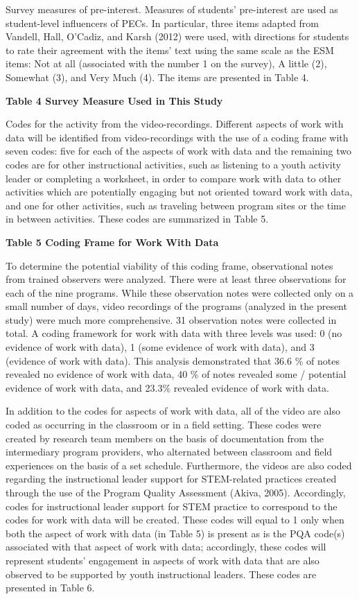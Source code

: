 \documentclass[]{msu-thesis}
\theoremstyle{definition}
\theoremstyle{definition}
\theoremstyle{definition}
\theoremstyle{remark}
\begin{document}
Survey measures of pre-interest. Measures of students' pre-interest are
used as student-level influencers of PECs. In particular, three items
adapted from Vandell, Hall, O'Cadiz, and Karsh (2012) were used, with
directions for students to rate their agreement with the items' text
using the same scale as the ESM items: Not at all (associated with the
number 1 on the survey), A little (2), Somewhat (3), and Very Much (4).
The items are presented in Table 4.

\textbf{Table 4 Survey Measure Used in This Study}

Codes for the activity from the video-recordings. Different aspects of
work with data will be identified from video-recordings with the use of
a coding frame with seven codes: five for each of the aspects of work
with data and the remaining two codes are for other instructional
activities, such as listening to a youth activity leader or completing a
worksheet, in order to compare work with data to other activities which
are potentially engaging but not oriented toward work with data, and one
for other activities, such as traveling between program sites or the
time in between activities. These codes are summarized in Table 5.

\textbf{Table 5 Coding Frame for Work With Data}

To determine the potential viability of this coding frame, observational
notes from trained observers were analyzed. There were at least three
observations for each of the nine programs. While these observation
notes were collected only on a small number of days, video recordings of
the programs (analyzed in the present study) were much more
comprehensive. 31 observation notes were collected in total. A coding
framework for work with data with three levels was used: 0 (no evidence
of work with data), 1 (some evidence of work with data), and 3 (evidence
of work with data). This analysis demonstrated that 36.6 \% of notes
revealed no evidence of work with data, 40 \% of notes revealed some /
potential evidence of work with data, and 23.3\% revealed evidence of
work with data.

In addition to the codes for aspects of work with data, all of the video
are also coded as occurring in the classroom or in a field setting.
These codes were created by research team members on the basis of
documentation from the intermediary program providers, who alternated
between classroom and field experiences on the basis of a set schedule.
Furthermore, the videos are also coded regarding the instructional
leader support for STEM-related practices created through the use of the
Program Quality Assessment (Akiva, 2005). Accordingly, codes for
instructional leader support for STEM practice to correspond to the
codes for work with data will be created. These codes will equal to 1
only when both the aspect of work with data (in Table 5) is present as
is the PQA code(s) associated with that aspect of work with data;
accordingly, these codes will represent students' engagement in aspects
of work with data that are also observed to be supported by youth
instructional leaders. These codes are presented in Table 6.
\end{document}
